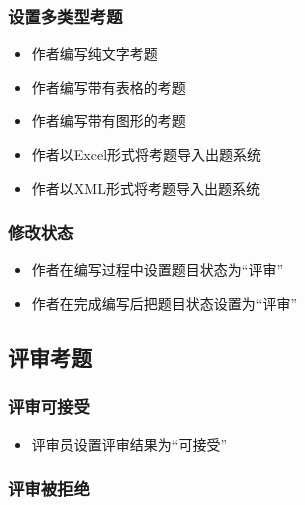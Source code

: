 \documentclass[hyperref, a4paper]{ctexart}
\providecommand{\tightlist}{%
  \setlength{\itemsep}{0pt}\setlength{\parskip}{0pt}}
\begin{document}
\hypertarget{ux8bbeux7f6eux591aux7c7bux578bux8003ux9898}{%
\subsubsection{设置多类型考题}\label{ux8bbeux7f6eux591aux7c7bux578bux8003ux9898}}

\begin{itemize}
\tightlist
\item
  作者编写纯文字考题
\item
  作者编写带有表格的考题
\item
  作者编写带有图形的考题
\item
  作者以Excel形式将考题导入出题系统
\item
  作者以XML形式将考题导入出题系统
\end{itemize}

\hypertarget{ux4feeux6539ux72b6ux6001-1}{%
\subsubsection{修改状态}\label{ux4feeux6539ux72b6ux6001-1}}

\begin{itemize}
\tightlist
\item
  作者在编写过程中设置题目状态为``评审''
\item
  作者在完成编写后把题目状态设置为``评审''
\end{itemize}

\hypertarget{ux8bc4ux5ba1ux8003ux9898}{%
\subsection{评审考题}\label{ux8bc4ux5ba1ux8003ux9898}}

\hypertarget{ux8bc4ux5ba1ux53efux63a5ux53d7}{%
\subsubsection{评审可接受}\label{ux8bc4ux5ba1ux53efux63a5ux53d7}}

\begin{itemize}
\tightlist
\item
  评审员设置评审结果为``可接受''
\end{itemize}

\hypertarget{ux8bc4ux5ba1ux88abux62d2ux7edd}{%
\subsubsection{评审被拒绝}\label{ux8bc4ux5ba1ux88abux62d2ux7edd}}
\end{document}
